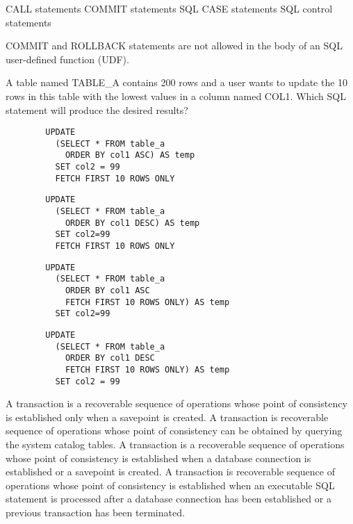 \documentclass[answers, 11pt]{exam}
\begin{document}
\begin{questions}
\begin{choices}
\choice CALL statements
\CorrectChoice COMMIT statements
\choice SQL CASE statements
\choice SQL control statements
\end{choices}

\begin{solution}
COMMIT and ROLLBACK statements are not allowed in the body of an SQL user-defined function (UDF).
\end{solution}

\newpage
\question[1]
A table named TABLE\_A contains 200 rows and a user wants to update the 10 rows in this table with the
lowest values in a column named COL1. Which SQL statement will produce the desired results?
\begin{choices}
\choice \begin{verbatim}
		UPDATE
		  (SELECT * FROM table_a
		    ORDER BY col1 ASC) AS temp
		  SET col2 = 99
		  FETCH FIRST 10 ROWS ONLY
		\end{verbatim}
\choice \begin{verbatim}
		UPDATE
		  (SELECT * FROM table_a
		    ORDER BY col1 DESC) AS temp
		  SET col2=99
		  FETCH FIRST 10 ROWS ONLY
		\end{verbatim}
\CorrectChoice \begin{verbatim}
		UPDATE
		  (SELECT * FROM table_a
		    ORDER BY col1 ASC
	  		FETCH FIRST 10 ROWS ONLY) AS temp
	  	  SET col2=99
		\end{verbatim}
\choice \begin{verbatim}
		UPDATE
		  (SELECT * FROM table_a
		    ORDER BY col1 DESC
		    FETCH FIRST 10 ROWS ONLY) AS temp
		  SET col2 = 99
		\end{verbatim}
\end{choices}

\begin{choices}
\choice A transaction is a recoverable sequence of operations whose point of consistency is established
only when a savepoint is created.
\choice A transaction is recoverable sequence of operations whose point of consistency can be obtained
by querying the system catalog tables.
\choice A transaction is a recoverable sequence of operations whose point of consistency is established
when a database connection is established or a savepoint is created.
\CorrectChoice A transaction is recoverable sequence of operations whose point of consistency is established
when an executable SQL statement is processed after a database connection has been established or a
previous transaction has been terminated.
\end{choices}


\end{questions}
\end{document}
